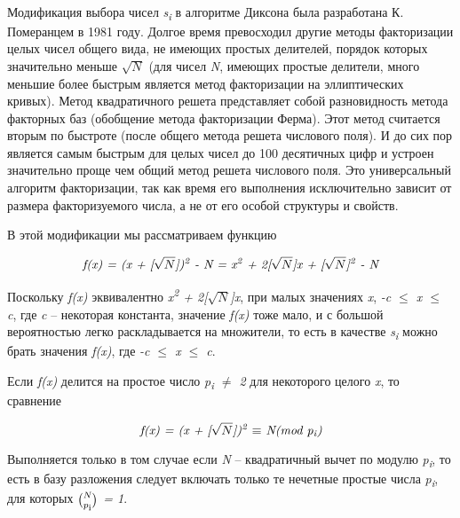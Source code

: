 \paragraph{} Модификация выбора чисел \textit{s\textsubscript{i}} в алгоритме Диксона была разработана К. Померанцем в 1981 году. Долгое время 
превосходил другие методы факторизации целых чисел общего вида, не имеющих простых делителей, порядок которых значительно меньше \textit{{$\sqrt{N}$}} 
(для чисел \textit{N}, имеющих простые делители, много меньшие более быстрым является метод факторизации на эллиптических кривых). 
Метод квадратичного решета представляет собой разновидность метода факторных баз (обобщение метода факторизации Ферма). 
Этот метод считается вторым по быстроте (после общего метода решета числового поля). И до сих пор является самым быстрым для 
целых чисел до 100 десятичных цифр и устроен значительно проще чем общий метод решета числового поля. Это универсальный алгоритм факторизации, 
так как время его выполнения исключительно зависит от размера факторизуемого числа, а не от его особой структуры и свойств.

  В этой модификации мы рассматриваем функцию
    
    \begin{equation}
      \textit{f(x) = (x + [{$\sqrt{N}$}])\textsuperscript{2} - N = x\textsuperscript{2} + 2[{$\sqrt{N}$}]x + [{$\sqrt{N}$}]\textsuperscript{2} - N}
    \end{equation}
    
  Поскольку \textit{f(x)} эквивалентно \textit{x\textsuperscript{2} + 2[{$\sqrt{N}$}]x}, при малых значениях \textit{x}, \textit{-c {$\le$} x {$\le$} c}, 
  где \textit{c} – некоторая константа, значение \textit{f(x)} тоже мало, и с большой вероятностью легко раскладывается на множители, то есть в 
  качестве \textit{s\textsubscript{i}} можно брать значения \textit{f(x)}, где \textit{-c {$\le$} x {$\le$} c}.
  
  Если \textit{f(x)} делится на простое число \textit{p\textsubscript{i} {$\ne$} 2} для некоторого целого \textit{x}, то сравнение
  
    \begin{equation}
      \textit{f(x) = (x + [{$\sqrt{N}$}])\textsuperscript{2} {$\equiv$} N(mod p\textsubscript{i})}
    \end{equation}
    
  Выполняется только в том случае если \textit{N} – квадратичный вычет по модулю \textit{p\textsubscript{i}}, то есть в базу разложения следует включать 
  только те нечетные простые числа \textit{p\textsubscript{i}}, для которых \textit{{$\binom{N}{p\textsubscript{i}}$} = 1}.
  
